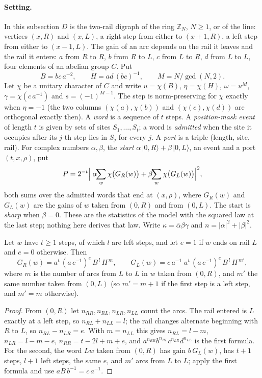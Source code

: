 \paragraph{Setting.} In this subsection $D$ is the two-rail digraph of the ring $\mathbb{Z}_N$, $N\ge1$, or of the line: vertices $(x,R)$ and $(x,L)$, a right step from either to $(x+1,R)$, a left step from either to $(x-1,L)$. The gain of an arc depends on the rail it leaves and the rail it enters: $a$ from $R$ to $R$, $b$ from $R$ to $L$, $c$ from $L$ to $R$, $d$ from $L$ to $L$, four elements of an abelian group $C$. Put
\[
B=bc\,a^{-2},\qquad H=ad\,(bc)^{-1},\qquad M=N/\gcd(N,2).
\]
Let $\chi$ be a unitary character of $C$ and write $u=\chi(B)$, $\eta=\chi(H)$, $\omega=u^{M}$, $\gamma=\chi(c\,a^{-1})$ and $s=(-1)^{M-1}$. The step is norm-preserving for $\chi$ exactly when $\eta=-1$ (the two columns $(\chi(a),\chi(b))$ and $(\chi(c),\chi(d))$ are orthogonal exactly then). A \emph{word} is a sequence of $t$ steps. A \emph{position-mask event} of length $t$ is given by sets of sites $S_1,\dots,S_t$; a word is \emph{admitted} when the site it occupies after its $j$-th step lies in $S_j$ for every $j$. A \emph{port} is a triple (length, site, rail). For complex numbers $\alpha,\beta$, the \emph{start} $\alpha\,|0,R\rangle+\beta\,|0,L\rangle$, an event and a port $(t,x,\rho)$, put
\begin{equation}\label{eq:portprob}
P=2^{-t}\Bigl|\;\alpha\!\!\sum_{w}\chi\bigl(G_R(w)\bigr)+\beta\!\!\sum_{w}\chi\bigl(G_L(w)\bigr)\Bigr|^{2},
\end{equation}
both sums over the admitted words that end at $(x,\rho)$, where $G_R(w)$ and $G_L(w)$ are the gains of $w$ taken from $(0,R)$ and from $(0,L)$. The start is \emph{sharp} when $\beta=0$. These are the statistics of the model with the squared law at the last step; nothing here derives that law. Write $\kappa=\bar\alpha\beta\gamma$ and $n=|\alpha|^{2}+|\beta|^{2}$.

\begin{lemma}\label{lem:wordgain}
Let $w$ have $t\ge1$ steps, of which $l$ are left steps, and let $e=1$ if $w$ ends on rail $L$ and $e=0$ otherwise. Then
\[
G_R(w)=a^{t}\,(a\,c^{-1})^{e}\,B^{\,l}\,H^{\,m},\qquad G_L(w)=c\,a^{-1}\;a^{t}\,(a\,c^{-1})^{e}\,B^{\,l}\,H^{\,m'},
\]
where $m$ is the number of arcs from $L$ to $L$ in $w$ taken from $(0,R)$, and $m'$ the same number taken from $(0,L)$ (so $m'=m+1$ if the first step is a left step, and $m'=m$ otherwise).
\end{lemma}
\begin{proof}
From $(0,R)$ let $n_{RR},n_{RL},n_{LR},n_{LL}$ count the arcs. The rail entered is $L$ exactly at a left step, so $n_{RL}+n_{LL}=l$; the rail changes alternate beginning with $R$ to $L$, so $n_{RL}-n_{LR}=e$. With $m=n_{LL}$ this gives $n_{RL}=l-m$, $n_{LR}=l-m-e$, $n_{RR}=t-2l+m+e$, and $a^{n_{RR}}b^{n_{RL}}c^{n_{LR}}d^{n_{LL}}$ is the first formula. For the second, the word $Lw$ taken from $(0,R)$ has gain $b\,G_L(w)$, has $t+1$ steps, $l+1$ left steps, the same $e$, and $m'$ arcs from $L$ to $L$; apply the first formula and use $aB\,b^{-1}=c\,a^{-1}$.
\end{proof}

